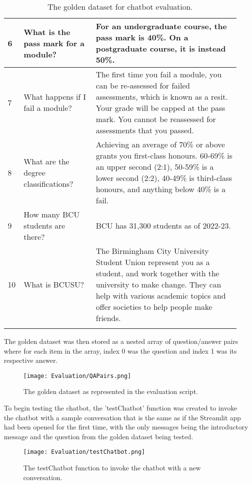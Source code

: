 \begin{longtable}{ | p{0.05\linewidth} | p{0.3\linewidth} | p{0.6\linewidth} | }
    \hline 
    6 & What is the pass mark for a module? &
    For an undergraduate course, the pass mark is 40\%. On a postgraduate course, it is instead 50\%. \\
    \hline 
    7 & What happens if I fail a module? &
    The first time you fail a module, you can be re-assessed for failed assessments, which is known as a resit. Your grade will be capped at the pass mark. You cannot be reassessed for assessments that you passed. \\ 
    \hline 
    8 & What are the degree classifications? &
    Achieving an average of 70\% or above grants you first-class honours. 60-69\% is an upper second (2:1), 50-59\% is a lower second (2:2), 40-49\% is third-class honours, and anything below 40\% is a fail. \\
    \hline 
    9 & How many BCU students are there? &
    BCU has 31,300 students as of 2022-23. \\ 
    \hline 
    10 & What is BCUSU? &
    The Birmingham City University Student Union represent you as a student, and work together with the university to make change. They can help with various academic topics and offer societies to help people make friends. \\
    \hline
    \caption{The golden dataset for chatbot evaluation.}\label{tab:GoldenDataset}
\end{longtable}

\para The golden dataset was then stored as a nested array of question/answer pairs where for each item in the array, index 0 was the question 
and index 1 was its respective answer. 

\begin{figure}[H]
    \centering
    \texttt{[image: Evaluation/QAPairs.png]}
    \caption{The golden dataset as represented in the evaluation script. \label{fig:GoldenDataset}}
\end{figure}

\noindent To begin testing the chatbot, the 'testChatbot' function was created to invoke the chatbot with 
a sample conversation that is the same as if the Streamlit app had been opened for the first time,
with the only messages being the introductory message and the question from the golden dataset being 
tested.

\begin{figure}[H]
    \centering
    \texttt{[image: Evaluation/testChatbot.png]}
    \caption{The testChatbot function to invoke the chatbot with a new conversation. \label{fig:testChatbot}}
\end{figure}

